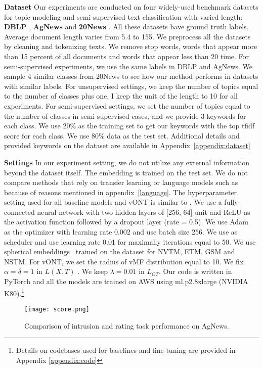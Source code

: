 \documentclass[11pt]{article}
\begin{document}
\textbf{Dataset} Our experiments are conducted on four widely-used benchmark datasets for topic modeling and semi-supervised text classification with varied length: \textbf{DBLP} \cite{DBLP:conf/ijcai/PanWZZW16}, \textbf{AgNews} \cite{zhang2016characterlevel} and \textbf{20News} \cite{lang1995newsweeder}. All these datasets have ground truth labels. Average document length varies from 5.4 to 155. We preprocess all the datasets by cleaning and tokenizing texts. We remove stop words, words that appear more than 15 percent of all documents and words that appear less than 20 time. For semi-supervised experiments, we use the same labels in DBLP and AgNews. We sample 4 similar classes from 20News to see how our method performs in datasets with similar labels. For unsupervised settings, we keep the number of topics equal to the number of classes plus one. I keep the unit of the length to 10 for all experiments. For semi-supervised settings, we set the number of topics equal to the number of classes in semi-supervised cases, and we provide 3 keywords for each class. We use 20\% as the training set to get our keywords with the top tfidf score for each class. We use 80\% data as the test set. Additional details and provided keywords on the dataset are available in Appendix~\ref{appendix:dataset}

\textbf{Settings} In our experiment setting, we do not utilize any external information beyond the dataset itself. The embedding is trained on the test set. We do not compare methods that rely on transfer learning or language models such as \cite{Bianchi2021PretrainingIA, Yu2021FineTuningPL,Wang2021XClassTC} because of reasons mentioned in appendix~\ref{language}.
The hyperparameter setting used for all baseline models and vONT is similar to \cite{JMLR:v20:18-569}. We use a fully-connected neural network with two hidden layers of [256, 64] unit and ReLU as the activation function followed by a dropout layer (rate = 0.5). We use Adam~\cite{kingma2017adam} as the optimizer with learning rate 0.002 and use batch size 256. We use \cite{smith2018superconvergence} as scheduler and use learning rate 0.01 for maximally iterations equal to 50. We use spherical embeddings~\cite{meng2019spherical} trained on the dataset for NVTM, ETM, GSM and NSTM. For vONT, we set the radius of vMF distribution equal to 10. We fix $\alpha = \delta = 1$ in $L(X,T)$ . We keep $\lambda = 0.01$ in $L_{OT}$.    
Our code is written in PyTorch and all the models are trained on AWS using ml.p2.8xlarge (NVIDIA K80).\footnote{Details on codebases used for baselines and fine-tuning are provided in Appendix  \ref{appendix:code}}
\begin{figure}
\centering
\texttt{[image: score.png]}
\caption{Comparison of intrusion and rating task performance on AgNews.}
\label{score}
\end{figure}
\end{document}
